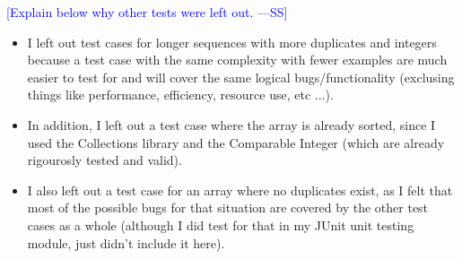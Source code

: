 \documentclass[12pt,fleqn]{examtst}
\newcommand{\authornote}[3]{\textcolor{#1}{[#3 ---#2]}}
\newcommand{\authornote}[3]{}
\newcommand{\wss}[1]{\authornote{blue}{SS}{#1}}
\begin{document}
\clearpage
\wss{Explain below why other tests were left out.}\\
\begin{itemize}
    \item I left out test cases for longer sequences with more duplicates and
    integers because a test case with the same complexity with fewer examples
    are much easier to test for and will cover the same logical
    bugs/functionality (exclusing things like performance, efficiency,
    resource use, etc ...).

    \item In addition, I left out a test case where the array is already sorted,
    since I used the Collections library and the Comparable Integer (which
    are already rigourosly tested and valid).

    \item I also left out a test case for an array where no duplicates exist,
    as I felt that most of the possible bugs for that situation are covered by
    the other test cases as a whole (although I did test for that in my JUnit
    unit testing module, just didn't include it here).
\end{itemize}


\newpage
\end{document}
